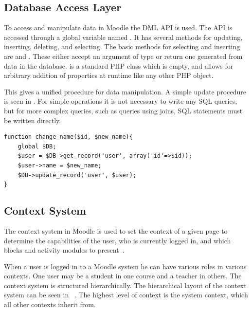 \subsection{Database Access Layer}
\label{sec:moodleoplatformdbml}
To access and manipulate data in Moodle the DML API is used.  
The API is accessed through a global variable named . 
It has several methods for updating, inserting, deleting, and selecting. 
The basic methods for selecting and inserting are  and .
These either accept an argument of type  or return one generated from data in the database.
 is a standard PHP class which is empty, and allows for arbitrary addition of properties at runtime like any other PHP object.

This gives a unified procedure for data manipulation. 
A simple update procedure is seen in .
For simple operations it is not necessary to write any SQL queries, but for more complex queries, such as queries using joins, SQL statements must be written directly.
\begin{lstlisting}[style=phpCode, caption=\myCaption{Example of how to change the name of a user}, label=moodlecodeupdate]
function change_name($id, $new_name){
	global $DB;
	$user = $DB->get_record('user', array('id'=>$id));
	$user->name = $new_name;
	$DB->update_record('user', $user);
}
\end{lstlisting}


\subsection{Context System}
\label{sub:contextsystem}
The context system in Moodle is used to set the context of a given page to determine the capabilities of the user, who is currently logged in, and which blocks and activity modules to present~\cite{moodlerolesandmodules}.
 
When a user is logged in to a Moodle system he can have various roles in various contexts. 
One user may be a student in one course and a teacher in others. 
The context system is structured hierarchically.
The hierarchical layout of the context system can be seen in ~\cite{moodlefilemoodlecontext}.
The highest level of context is the system context, which all other contexts inherit from.
 
